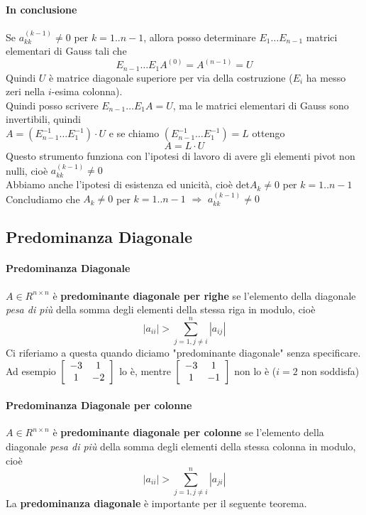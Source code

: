 \documentclass[10pt]{book}
\begin{document}
\paragraph{In conclusione} Se $a_{kk}^{(k-1)} \neq 0$ per $k = 1..n-1$, allora posso determinare $E_1\ldots E_{n-1}$ matrici elementari di Gauss tali che
$$E_{n-1}\ldots E_1 A^{(0)} = A^{(n-1)} = U$$
Quindi $U$ è matrice diagonale superiore per via della costruzione ($E_i$ ha messo zeri nella $i$-esima colonna).\\
Quindi posso scrivere $E_{n-1}\ldots E_1 A = U$, ma le matrici elementari di Gauss sono invertibili, quindi\\
$A = (E_{n-1}^{-1}\ldots E_1^{-1})\cdot U$ e se chiamo $(E_{n-1}^{-1}\ldots E_1^{-1}) = L$ ottengo $$A = L \cdot U$$
Questo strumento funziona con l'ipotesi di lavoro di avere gli elementi pivot non nulli, cioè $a_{kk}^{(k-1)} \neq 0$\\
Abbiamo anche l'ipotesi di esistenza ed unicità, cioè det$A_k \neq 0$ per $k = 1 .. n-1$\\Concludiamo che $A_k \neq 0$ per $k = 1 .. n-1$ $\Rightarrow$ $a_{kk}^{(k-1)} \neq 0$
\subsection{Predominanza Diagonale}
\paragraph{Predominanza Diagonale} $A \in R^{n \times n}$ è \textbf{predominante diagonale per righe} se l'elemento della diagonale \textit{pesa di più} della somma degli elementi della stessa riga in modulo, cioè $$|a_{ii}| > \sum_{j=1, j \neq i}^n |a_{ij}|$$
Ci riferiamo a questa quando diciamo "predominante diagonale" senza specificare.\\
Ad esempio \begin{math}
\left[ \begin{array}{c c}
-3 & 1 \\
1 & -2
\end{array} \right]
\end{math}
lo è, mentre
\begin{math}
\left[ \begin{array}{c c}
-3 & 1 \\
1 & -1
\end{array} \right]
\end{math}
non lo è ($i = 2$ non soddisfa)
\paragraph{Predominanza Diagonale per colonne} $A \in R^{n \times n}$ è \textbf{predominante diagonale per colonne} se l'elemento della diagonale \textit{pesa di più} della somma degli elementi della stessa colonna in modulo, cioè $$|a_{ii}| > \sum_{j=1, j \neq i}^n |a_{ji}|$$
La \textbf{predominanza diagonale} è importante per il seguente teorema.
\end{document}
